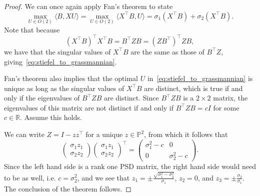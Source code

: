 \documentclass{article}
\numberwithin{equation}{section}
\newcommand{\R}{\mathbb{R}}
\newcommand{\PP}{\mathbb{P}}
\begin{document}
\begin{proof}
    We can once again apply Fan's theorem to state 
    \[
        \max_{U \in O(2)}\langle B, XU\rangle = 
        \max_{U \in O(2)}\langle X^{\intercal}B, U\rangle =
        \sigma_1(X^{\intercal}B) + \sigma_2(X^{\intercal}B).
    \]
    Note that because 
    \[
    (X^{\intercal}B)^{\intercal}X^{\intercal}B = 
    B^{\intercal}ZB = 
    (ZB^{\intercal})^{\intercal}ZB,
    \]
    we have that the singular values of $X^{\intercal}B$ are the same as those of $B^{\intercal}Z$, giving~\eqref{eq:stiefel_to_grassmannian}.

    Fan's theorem also implies that the optimal $U$ in~\eqref{eq:stiefel_to_grassmannian} is unique as long as the singular values of $X^{\intercal}B$ are distinct, which is true if and only if the eigenvalues of $B^{\intercal}ZB$ are distinct. Since $B^{\intercal}ZB$ is a $2\times 2$ matrix, the eigenvalues of this matrix are not distinct if and only if $B^{\intercal}ZB = cI$  for some $c \in \R$.
    Assume this holds.

    We can write $Z = I - zz^{\intercal}$ for a unique $z \in \PP^2$, from which it follows that
    \[
        \begin{pmatrix}\sigma_1 z_1\\ \sigma_2z_2\end{pmatrix}
        \begin{pmatrix}\sigma_1 z_1\\ \sigma_2z_2\end{pmatrix}^{\intercal} =
        \begin{pmatrix}
            \sigma_1^2 - c & 0 \\ 0 & \sigma_2^2 - c
        \end{pmatrix}.
    \]
    Since the left hand side is a rank one PSD matrix, the right hand side would need to be as well, i.e. $c = \sigma_2^2$, and we see that
    $z_1 = \pm \frac{\sqrt{\sigma_1^2 - \sigma_2^2}}{\sigma_1}$, $z_2 = 0$, and $z_3 = \pm \frac{\sigma_2}{\sigma_1}$.
    The conclusion of the theorem follows.
\end{proof}
\end{document}
